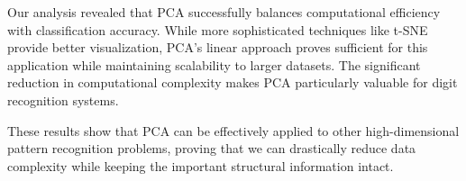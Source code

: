 \documentclass{article}
\begin{document}
Our analysis revealed that PCA successfully balances computational efficiency with classification accuracy. While more sophisticated techniques like t-SNE provide better visualization, PCA's linear approach proves sufficient for this application while maintaining scalability to larger datasets. The significant reduction in computational complexity makes PCA particularly valuable for digit recognition systems.

These results show that PCA can be effectively applied to other high-dimensional pattern recognition problems, proving that we can drastically reduce data complexity while keeping the important structural information intact.




\end{document}
